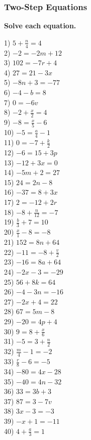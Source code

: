 \documentclass[12pt]{book}
\theoremstyle{definition}
\begin{document}
\subsubsection*{Two-Step Equations}
{\bf Solve each equation.}
\begin{multicols}{4}
  1) $5 + \frac{n}{4} = 4$\\
  2) $- 2 = - 2 m + 12$\\
  3) $102 = - 7 r + 4$\\
  4) $27 = 21 - 3 x$\\
  5) $- 8 n + 3 = - 77$\\
  6) $- 4 - b = 8$\\
  7) $0 = - 6 v$\\
  8) $- 2 + \frac{x}{2} = 4$\\
  9) $- 8 = \frac{x}{5} - 6$\\
  10) $- 5 = \frac{a}{4} - 1$\\
  11) $0 = - 7 + \frac{k}{2}$\\
  12) $- 6 = 15 + 3 p$\\
  13) $- 12 + 3 x = 0$\\
  14) $- 5 m + 2 = 27$\\
  15) $24 = 2 n - 8$\\
  16) $- 37 = 8 + 3 x$\\
  17) $2 = - 12 + 2 r$\\
  18) $- 8 + \frac{n}{12} = - 7$\\
  19) $\frac{b}{3} + 7 = 10$\\
  20) $\frac{x}{1} - 8 = - 8$\\
  21) $152 = 8 n + 64$\\
  22) $- 11 = - 8 + \frac{v}{2}$\\
  23) $- 16 = 8 a + 64$\\
  24) $- 2 x - 3 = - 29$\\
  25) $56 + 8 k = 64$\\
  26) $- 4 - 3 n = - 16$\\
  27) $- 2 x + 4 = 22$\\
  28) $67 = 5 m - 8$\\
  29) $- 20 = 4 p + 4$\\
  30) $9 = 8 + \frac{x}{6}$\\
  31) $- 5 = 3 + \frac{n}{2}$\\
  32) $\frac{m}{4} - 1 = - 2$\\
  33) $\frac{r}{8} - 6 = - 5$\\
  34) $- 80 = 4 x - 28$\\
  35) $- 40 = 4 n - 32$\\
  36) $33 = 3 b + 3$\\
  37) $87 = 3 - 7 v$\\
  38) $3 x - 3 = - 3$\\
  39) $- x + 1 = - 11$\\
  40) $4 + \frac{a}{3} = 1$
\end{multicols}
\end{document}
